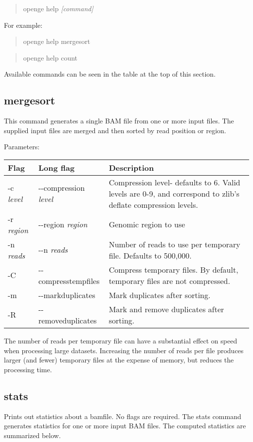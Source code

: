 \documentclass[11pt]{article}
\newcommand {\cmd}[1] {\begin{quote}#1\end{quote}}
\begin{document}
\cmd{openge help \textit{[command]}}

For example:

\cmd{openge help mergesort}

\cmd{openge help count}

Available commands can be seen in the table at the top of this section.


\subsection {mergesort}
This command generates a single BAM file from one or more input files. The supplied input files are merged and then sorted by read position or region.

Parameters:
\begin{center}
\begin{tabular}{llp{3.5in}}
\hline
Flag&Long flag&Description\\ \hline
-c \textit{level}&{-}{-}compression \textit{level}&Compression level- defaults to 6. Valid levels are 0-9, and correspond to zlib's deflate compression levels. \\
-r \textit{region}&{-}{-}region \textit{region}&Genomic region to use\\
-n \textit{reads}&{-}{-}n \textit{reads}&Number of reads to use per temporary file. Defaults to 500,000.\\
-C&{-}{-}compresstempfiles&Compress temporary files. By default, temporary files are not compressed.\\
-m&{-}{-}markduplicates&Mark duplicates after sorting.\\
-R&{-}{-}removeduplicates&Mark and remove duplicates after sorting.\\
\end{tabular}
\end{center}

The number of reads per temporary file can have a substantial effect on speed when processing large datasets. Increasing the number of reads per file produces larger (and fewer) temporary files at the expense of memory, but reduces the processing time.

\subsection{stats}
Prints out statistics about a bamfile. No flags are required.
The stats command generates statistics for one or more input BAM files. The computed statistics are summarized below.
\end{document}
